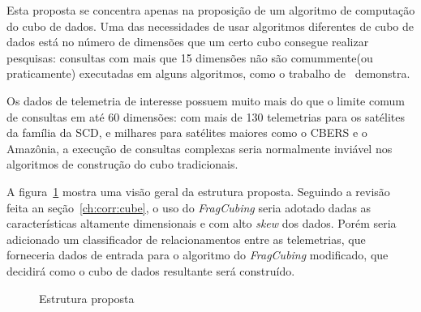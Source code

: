 {\color{cerulean}
Esta proposta se concentra apenas na proposição de um algoritmo de computação do cubo de dados.
Uma das necessidades de usar algoritmos diferentes de cubo de dados está no número de dimensões que um certo cubo consegue realizar pesquisas: consultas com mais que 15 dimensões não são comummente(ou praticamente) executadas em alguns algoritmos, como o trabalho de~ demonstra.

Os dados de telemetria de interesse possuem muito mais do que o limite comum de consultas em até 60 dimensões: com mais de 130 telemetrias para os satélites da família da SCD, e milhares para satélites maiores como o CBERS e o Amazônia, a execução de consultas complexas seria normalmente inviável nos algoritmos de construção do cubo tradicionais.

A figura~\ref{fig:qualistructure} mostra uma visão geral da estrutura proposta.
Seguindo a revisão feita an seção~\ref{ch:corr:cube}, o uso do \textit{FragCubing} seria adotado dadas as características altamente dimensionais e com alto \textit{skew} dos dados.
Porém seria adicionado um classificador de relacionamentos entre as telemetrias, que forneceria dados de entrada para o algoritmo do \textit{FragCubing} modificado, que decidirá como o cubo de dados resultante será construído.

\begin{figure}[!htb]
	\caption{Estrutura proposta}\label{fig:qualistructure}
	\vspace{2mm}
	\begin{center}
	\end{center}
	\vspace{1mm}
	\legenda{}
\end{figure}

}
